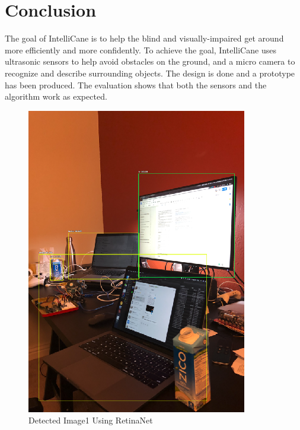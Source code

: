 \section{Conclusion}
The goal of IntelliCane is to help the blind and visually-impaired get around more efficiently and more confidently. To achieve the goal, IntelliCane uses ultrasonic sensors to help avoid obstacles on the ground, and a micro camera to recognize and describe surrounding objects. The design is done and a prototype has been produced. The evaluation shows that both the sensors and the algorithm work as expected.


\begin{figure}
  \includegraphics{figure3}
  \caption{Detected Image1 Using RetinaNet}
\end{figure}

